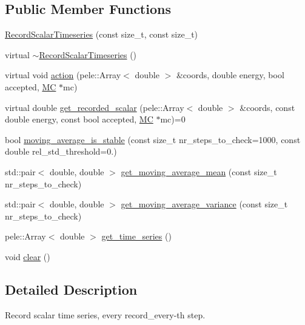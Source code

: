 \subsection*{\-Public \-Member \-Functions}
\begin{DoxyCompactItemize}
\item 
\hyperlink{classmcpele_1_1RecordScalarTimeseries_af446b764d9a8f16f67c751bfb94a47d1}{\-Record\-Scalar\-Timeseries} (const size\-\_\-t, const size\-\_\-t)
\item 
virtual \hyperlink{classmcpele_1_1RecordScalarTimeseries_aba51863fc7829b1fa7a2908ea3b8dd3c}{$\sim$\-Record\-Scalar\-Timeseries} ()
\item 
virtual void \hyperlink{classmcpele_1_1RecordScalarTimeseries_a7cc733d8f0b8daebf4da92423793b9c7}{action} (pele\-::\-Array$<$ double $>$ \&coords, double energy, bool accepted, \hyperlink{classmcpele_1_1MC}{\-M\-C} $\ast$mc)
\item 
virtual double \hyperlink{classmcpele_1_1RecordScalarTimeseries_a8151f9f679c926d481e7354ac170663a}{get\-\_\-recorded\-\_\-scalar} (pele\-::\-Array$<$ double $>$ \&coords, const double energy, const bool accepted, \hyperlink{classmcpele_1_1MC}{\-M\-C} $\ast$mc)=0
\item 
bool \hyperlink{classmcpele_1_1RecordScalarTimeseries_a98fce48e1cc8cd2e73fb0705a4d05cde}{moving\-\_\-average\-\_\-is\-\_\-stable} (const size\-\_\-t nr\-\_\-steps\-\_\-to\-\_\-check=1000, const double rel\-\_\-std\-\_\-threshold=0.)
\item 
std\-::pair$<$ double, double $>$ \hyperlink{classmcpele_1_1RecordScalarTimeseries_aa5cce7dde2ec7f096baeefad210ff063}{get\-\_\-moving\-\_\-average\-\_\-mean} (const size\-\_\-t nr\-\_\-steps\-\_\-to\-\_\-check)
\item 
std\-::pair$<$ double, double $>$ \hyperlink{classmcpele_1_1RecordScalarTimeseries_a0df1f17ac9304e831f37e7e97bf45b83}{get\-\_\-moving\-\_\-average\-\_\-variance} (const size\-\_\-t nr\-\_\-steps\-\_\-to\-\_\-check)
\item 
pele\-::\-Array$<$ double $>$ \hyperlink{classmcpele_1_1RecordScalarTimeseries_ad3c2dbc09a421030dcddff87d96299e5}{get\-\_\-time\-\_\-series} ()
\item 
void \hyperlink{classmcpele_1_1RecordScalarTimeseries_a0f616cd3a4e0dea710c0919f22b8f5ce}{clear} ()
\end{DoxyCompactItemize}


\subsection{\-Detailed \-Description}
\-Record scalar time series, every record\-\_\-every-\/th step. 

